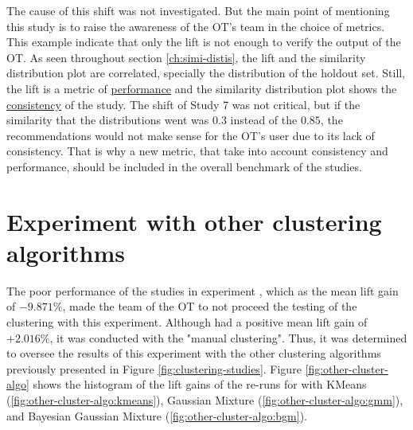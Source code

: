 The cause of this shift was not investigated. But the main point of mentioning this study is to raise the awareness of the OT's team in the choice of metrics. This example indicate that only the lift is not enough to verify the output of the OT. As seen throughout section \ref{ch:simi-distis}, the lift and the similarity distribution plot are correlated, specially the distribution of the holdout set. Still, the lift is a metric of \underline{performance} and the similarity distribution plot shows the \underline{consistency} of the study. The shift of Study 7 was not critical, but if the similarity that the distributions went was $0.3$ instead of the $0.85$, the recommendations would not make sense for the OT's user due to its lack of consistency. That is why a new metric, that take into account consistency and performance, should be included in the overall benchmark of the studies.


\section{Experiment \nameExperimentII{} with other clustering algorithms}

The poor performance of the studies in experiment \nameExperimentI{}, which as the mean lift gain of $-9.871\%$, made the team of the OT to not proceed the testing of the clustering with this experiment. Although \nameExperimentII{} had a positive mean lift gain of $+2.016\%$, it was conducted with the "manual clustering". Thus, it was determined to oversee the results of this experiment with the other clustering algorithms previously presented in Figure \ref{fig:clustering-studies}. Figure \ref{fig:other-cluster-algo} shows the histogram of the lift gains of the re-runs for \nameExperimentII{} with KMeans (\ref{fig:other-cluster-algo:kmeans}), Gaussian Mixture (\ref{fig:other-cluster-algo:gmm}), and Bayesian Gaussian Mixture (\ref{fig:other-cluster-algo:bgm}).

